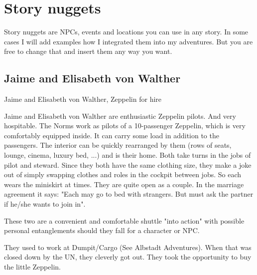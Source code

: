 \chapter{Story nuggets}

Story nuggets are NPCs, events and locations you can use in any story. In some cases I will add examples how I integrated them into my adventures. But you are free to change that and insert them any way you want.

\section{Jaime and Elisabeth von Walther}
\label{sec:Jaime and Elisabeth}

Jaime and Elisabeth von Walther, Zeppelin for hire

Jaime and Elisabeth von Walther are enthusiastic Zeppelin pilots. And very hospitable.
The Norms work as pilots of a 10-passenger Zeppelin, which is very comfortably equipped inside. It can carry some load in addition to the passengers.
The interior can be quickly rearranged by them (rows of seats, lounge, cinema, luxury bed, ...) and is their home.
Both take turns in the jobs of pilot and steward. Since they both have the same clothing size, they make a joke out of simply swapping clothes and roles in the cockpit between jobs. So each wears the miniskirt at times.
They are quite open as a couple. In the marriage agreement it says:
"Each may go to bed with strangers. But must ask the partner if he/she wants to join in".

These two are a convenient and comfortable shuttle "into action" with possible personal entanglements should they fall for a character or NPC.

They used to work at Dumpit/Cargo (See Albstadt Adventures). When that was closed down by the UN, they cleverly got out. They took the opportunity to buy the little Zeppelin.